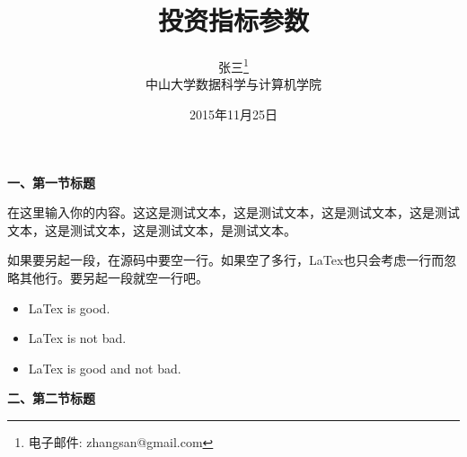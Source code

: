 \documentclass[a4paper, 12pt]{ctexart}
\title{投资指标参数}
\author{张三\footnote{电子邮件: zhangsan@gmail.com}\\[2ex]
\xiaosihao 中山大学数据科学与计算机学院\\[2ex]
}
\date{2015年11月25日}
\newcommand{\sihao}{\fontsize{14pt}{\baselineskip}\selectfont}
\newcommand{\xiaosihao}{\fontsize{12pt}{\baselineskip}\selectfont}
\begin{document}
\maketitle             %
\setcounter{page}{0}
\thispagestyle{empty}

\newpage               %

\hspace{-2em}\textbf{\sihao 一、第一节标题}

在这里输入你的内容。这这是测试文本，这是测试文本，这是测试文本，这是测试文本，这是测试文本，这是测试文本，是测试文本。

如果要另起一段，在源码中要空一行。如果空了多行，LaTex也只会考虑一行而忽略其他行。要另起一段就空一行吧。

\vspace{-3ex}     %
\begin{itemize}\setlength{\itemindent}{1em}\setlength{\itemsep}{0.3ex}
    \item LaTex is good.
    \item LaTex is not bad.
    \item LaTex is good and not bad.
\end{itemize}

\vspace{2ex}
\hspace{-2em}\textbf{\sihao 二、第二节标题}
\end{document}
